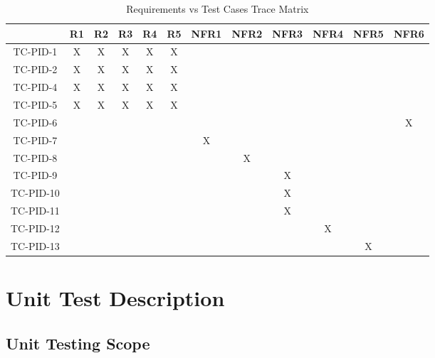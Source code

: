 \documentclass[12pt, titlepage]{article}
\begin{document}
\begin{table}[]
\caption{Requirements vs Test Cases Trace Matrix}
\label{tblTrace}
\begin{tabular}{|c|c|c|c|c|c|c|c|c|c|c|c|}
\hline
          & R1 & R2 & R3 & R4 & R5 & NFR1 & NFR2 & NFR3 & NFR4 & NFR5 & NFR6 \\ \hline
TC-PID-1  & X  & X  & X  & X  & X  &      &      &      &      &      &      \\ \hline
TC-PID-2  & X  & X  & X  & X  & X  &      &      &      &      &      &      \\ \hline
TC-PID-4  & X  & X  & X  & X  & X  &      &      &      &      &      &      \\ \hline
TC-PID-5  & X  & X  & X  & X  & X  &      &      &      &      &      &      \\ \hline
TC-PID-6  &    &    &    &    &    &      &      &      &      &      & X    \\ \hline
TC-PID-7  &    &    &    &    &    & X    &      &      &      &      &      \\ \hline
TC-PID-8  &    &    &    &    &    &      & X    &      &      &      &      \\ \hline
TC-PID-9  &    &    &    &    &    &      &      & X    &      &      &      \\ \hline
TC-PID-10 &    &    &    &    &    &      &      & X    &      &      &      \\ \hline
TC-PID-11 &    &    &    &    &    &      &      & X    &      &      &      \\ \hline
TC-PID-12 &    &    &    &    &    &      &      &      & X    &      &      \\ \hline
TC-PID-13 &    &    &    &    &    &      &      &      &      & X    &      \\ \hline
\end{tabular}
\end{table}

\section{Unit Test Description}  \label{sec_unit_tests}


\subsection{Unit Testing Scope}
\end{document}
